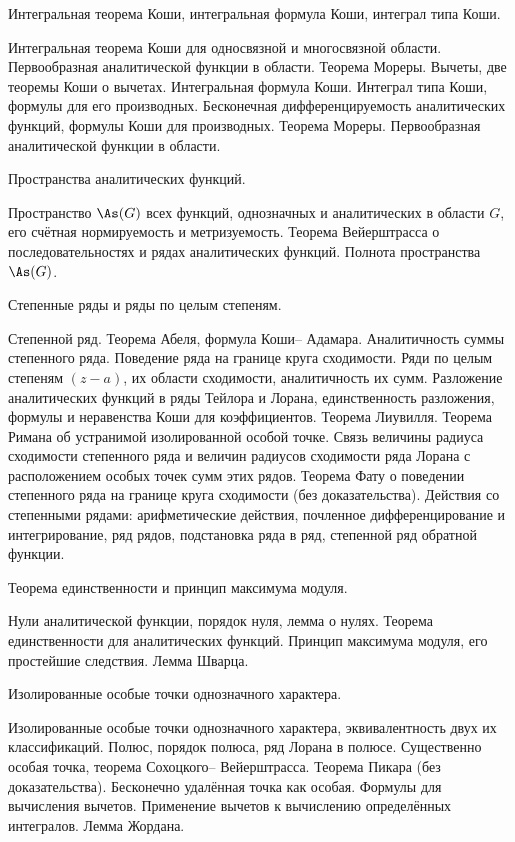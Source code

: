 \documentclass[a4paper]{article}
\begin{document}
\begin{nums}{-2}
\item Интегральная теорема Коши, интегральная формула Коши, интеграл типа Коши.

Интегральная теорема Коши для односвязной и многосвязной области. Первообразная аналитической функции в
области. Теорема Мореры. Вычеты, две теоремы Коши о вычетах. Интегральная формула Коши. Интеграл типа Коши,
формулы для его производных. Бесконечная дифференцируемость аналитических функций, формулы Коши для
производных. Теорема Мореры. Первообразная аналитической функции в области.

\item Пространства аналитических функций.

Пространство $\As(G)$ всех функций, однозначных и
аналитических в области $G$, его счётная нормируемость и метризуемость. Теорема Вейерштрасса о
последовательностях и рядах аналитических функций. Полнота пространства $\As(G)$.

\item Степенные ряды и ряды по целым степеням.

Степенной ряд. Теорема Абеля, формула Коши-- Адамара.
Аналитичность суммы степенного ряда. Поведение ряда на границе круга сходимости. Ряди по целым степеням $(z-a)$,
их области сходимости, аналитичность их сумм. Разложение аналитических функций в ряды Тейлора и Лорана,
единственность разложения, формулы и неравенства Коши для коэффициентов. Теорема Лиувилля. Теорема Римана об
устранимой изолированной особой точке. Связь величины радиуса сходимости степенного ряда и величин
радиусов сходимости ряда Лорана с расположением особых точек сумм этих рядов. Теорема Фату о поведении
степенного ряда на границе круга сходимости (без доказательства). Действия со степенными рядами: арифметические
действия, почленное дифференцирование и интегрирование, ряд рядов, подстановка ряда в ряд, степенной ряд
обратной функции.

\item Теорема единственности и принцип максимума модуля.

Нули аналитической функции, порядок нуля, лемма о нулях.
Теорема единственности для аналитических функций. Принцип максимума модуля, его простейшие следствия. Лемма Шварца.

\item Изолированные особые точки однозначного характера.

Изолированные особые точки однозначного характера,
эквивалентность двух их классификаций. Полюс, порядок полюса, ряд Лорана в полюсе. Существенно особая точка,
теорема Сохоцкого-- Вейерштрасса. Теорема Пикара (без доказательства). Бесконечно удалённая точка как особая.
Формулы для вычисления вычетов. Применение вычетов к вычислению определённых интегралов. Лемма Жордана.
\end{nums}
\end{document}

